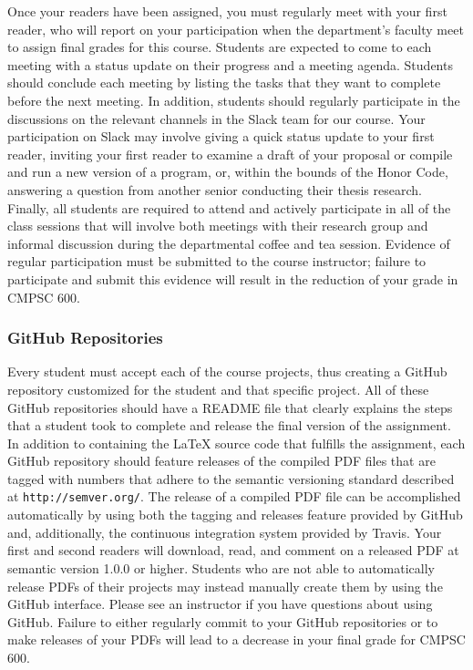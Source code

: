 \documentclass[11pt]{article}
\newcommand{\url}[1]{\lstinline{#1}}
\begin{document}
Once your readers have been assigned, you must regularly meet with your first
reader, who will report on your participation when the department's faculty meet
to assign final grades for this course. Students are expected to come to each
meeting with a status update on their progress and a meeting agenda. Students
should conclude each meeting by listing the tasks that they want to complete
before the next meeting. In addition, students should regularly participate in
the discussions on the relevant channels in the Slack team for our course. Your
participation on Slack may involve giving a quick status update to your first
reader, inviting your first reader to examine a draft of your proposal or
compile and run a new version of a program, or, within the bounds of the Honor
Code, answering a question from another senior conducting their thesis research.
Finally, all students are required to attend and actively participate in all of
the class sessions that will involve both meetings with their research group and
informal discussion during the departmental coffee and tea session. Evidence of
regular participation must be submitted to the course instructor; failure to
participate and submit this evidence will result in the reduction of your grade
in CMPSC 600.

\subsubsection*{GitHub Repositories}

Every student must accept each of the course projects, thus creating a GitHub
repository customized for the student and that specific project. All of these
GitHub repositories should have a README file that clearly explains the steps
that a student took to complete and release the final version of the assignment.
In addition to containing the \LaTeX{} source code that fulfills the assignment,
each GitHub repository should feature releases of the compiled PDF files that
are tagged with numbers that adhere to the semantic versioning standard
described at \url{http://semver.org/}. The release of a compiled PDF file can be
accomplished automatically by using both the tagging and releases feature
provided by GitHub and, additionally, the continuous integration system provided
by Travis. Your first and second readers will download, read, and comment on a
released PDF at semantic version 1.0.0 or higher. Students who are not able to
automatically release PDFs of their projects may instead manually create them by
using the GitHub interface. Please see an instructor if you have questions about
using GitHub. Failure to either regularly commit to your GitHub repositories or
to make releases of your PDFs will lead to a decrease in your final grade for
CMPSC 600.
\end{document}
